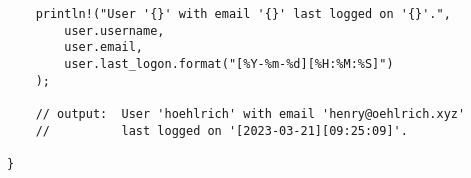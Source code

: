 \documentclass[12pt]{article}
\begin{document}
\begin{flushleft}
\begin{verbatim}
    println!("User '{}' with email '{}' last logged on '{}'.",
        user.username,
        user.email,
        user.last_logon.format("[%Y-%m-%d][%H:%M:%S]")
    );

    // output:  User 'hoehlrich' with email 'henry@oehlrich.xyz'
    //          last logged on '[2023-03-21][09:25:09]'.

}
\end{verbatim}
\doublespacing{}

\cite{rustforrustaceans} \\
\cite{rust-lang.org} \\
\cite{rust-by-example} \\
\cite{the-c-programming-language} \\
\cite{noboilerplate}


 

\end{flushleft}
\end{document}
